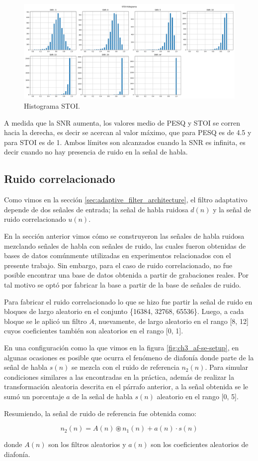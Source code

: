 \begin{figure}[H]
	\centering
	\centerline{\includegraphics[scale=0.35]{images/ch5/stoi_aggregated.png}}
	\caption{Histograma STOI.}
	\label{fig:ch5_stoi_histogram}
\end{figure}

A medida que la SNR aumenta, los valores medio de PESQ y STOI se corren hacia la derecha, es decir se acercan al valor máximo, que para PESQ es de 4.5 y para STOI es de 1. Ambos límites son alcanzados cuando la SNR es infinita, es decir cuando no hay presencia de ruido en la señal de habla.

\subsection{Ruido correlacionado}

Como vimos en la sección \ref{sec:adaptive_filter_architecture}, el filtro adaptativo depende de dos señales de entrada; la señal de habla ruidosa $d(n)$ y la señal de ruido correlacionado $u(n)$. 

En la sección anterior vimos cómo se construyeron las señales de habla ruidosa mezclando señales de habla con señales de ruido, las cuales fueron obtenidas de bases de datos comúnmente utilizadas en experimentos relacionados con el presente trabajo. Sin embargo, para el caso de ruido correlacionado, no fue posible encontrar una base de datos obtenida a partir de grabaciones reales. Por tal motivo se optó por fabricar la base a partir de la base de señales de ruido.

Para fabricar el ruido correlacionado lo que se hizo fue partir la señal de ruido en bloques de largo aleatorio en el conjunto \{16384, 32768, 65536\}. Luego, a cada bloque se le aplicó un filtro $A$, nuevamente, de largo aleatorio en el rango [8, 12] cuyos coeficientes también son aleatorios en el rango [0, 1].

En una configuración como la que vimos en la figura \ref{fig:ch3_af-se-setup}, en algunas ocasiones es posible que ocurra el fenómeno de diafonía donde parte de la señal de habla $s(n)$ se mezcla con el ruido de referencia $n_2(n)$. Para simular condiciones similares a las encontradas en la práctica, además de realizar la transformación aleatoria descrita en el párrafo anterior, a la señal obtenida se le sumó un porcentaje $a$ de la señal de habla $s(n)$ aleatorio en el rango [0, 5].

Resumiendo, la señal de ruido de referencia fue obtenida como:

\begin{equation*}
	n_2(n) = A(n) \circledast n_1(n) + a(n) \cdot s(n)
\end{equation*}

\noindent donde $A(n)$ son los filtros aleatorios y $a(n)$ son los coeficientes aleatorios de diafonía.